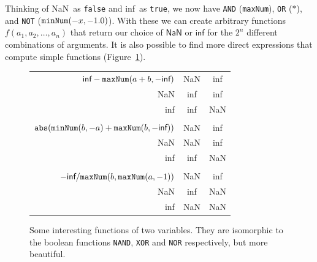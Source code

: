 \documentclass[twocolumn,cm]{article}
\newcommand\nan{\textsf{NaN}}
\renewcommand\inf{\textsf{inf}}
\begin{document}
Thinking of \nan\ as {\tt false} and \inf\ as {\tt true}, we now have {\tt AND} ({\tt maxNum}),
{\tt OR} ($*$), and {\tt NOT} (${\tt minNum}(-x, -1.0)$). With these we can create arbitrary
functions $f(a_1, a_2, \ldots, a_n)$ that return our choice of $\nan$ or $\inf$ for the $2^n$
different combinations of arguments. It is also possible to find more direct expressions that
compute simple functions (Figure~\ref{fig:truthtables2}).


\begin{figure}[ht]
\renewcommand*{\arraystretch}{1.4}

  \begin{tabular}{r|cc}
    \multicolumn{1}{r}{$\inf - {\tt maxNum}(a + b, -\inf)$} & \multicolumn{1}{c}{\nan} & \inf \\[0.2em]\cline{2-3}
    \nan & \inf & \inf \\
    \inf & \inf & \nan \\
    \multicolumn{3}{c}{}\\[0.1em]
    \multicolumn{1}{r}{${\tt abs}({\tt minNum}(b, -a) + {\tt maxNum}(b, -\inf))$} & \multicolumn{1}{c}{\nan} & \inf \\[0.2em]\cline{2-3}
    \nan & \nan & \inf \\
    \inf & \inf & \nan \\
    \multicolumn{3}{c}{}\\[0.1em]
    \multicolumn{1}{r}{$-\inf / {\tt maxNum}(b, {\tt maxNum}(a, -1))$} & \multicolumn{1}{c}{\nan} & \inf \\[0.2em]\cline{2-3}
    \nan & \inf & \nan \\
    \inf & \nan & \nan \\
  \end{tabular}

  \caption{
    Some interesting functions of two variables. They are isomorphic to the boolean functions {\tt NAND},
    {\tt XOR} and {\tt NOR} respectively, but more beautiful.
  } \label{fig:truthtables2}
\end{figure}
\end{document}
